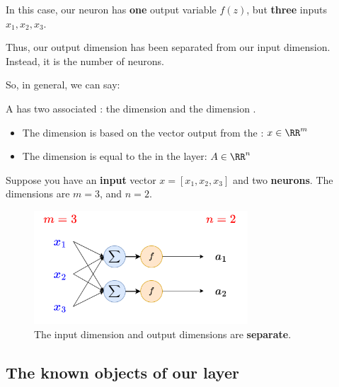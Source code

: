         In this case, our neuron has \textbf{one} output variable $f(z)$, but \textbf{three} inputs $x_1,x_2,x_3$.
        
        Thus, our output dimension has been separated from our input dimension. Instead, it is the number of neurons.
        
        So, in general, we can say:\\
        
        \begin{notation}
            A  has two associated : the  dimension  and the  dimension .
            
            \begin{itemize}
                \item The  dimension  is based on the vector output from the : $x \in \RR^m$
                
                \item The  dimension  is equal to the  in the  layer: $A \in \RR^n$
            \end{itemize}
        \end{notation}
        
        \miniex Suppose you have an \textbf{input} vector $x=[x_1, x_2, x_3]$ and two \textbf{neurons}. The dimensions are $m=3$, and $n=2$.
    
        \begin{figure}[H]
            \centering
            \includegraphics[width=80mm,scale=0.4]{images/nn_images/dimensions_network.png}
            \caption*{The input dimension and output dimensions are \textbf{separate}.}
        \end{figure}
        
    \subsection*{The known objects of our layer}
    
